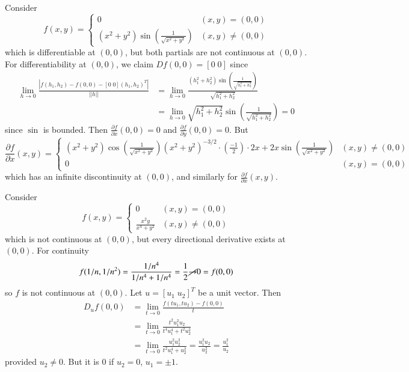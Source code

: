 \begin{eg}
    Consider \begin{equation*}
        f(x,y) = \left\{\begin{array}{lc} 0 & (x,y) = (0,0) \\ (x^2+y^2)\sin\left(\frac{1}{\sqrt{x^2+y^2}}\right) & (x,y) \neq (0,0)\end{array}\right.
    \end{equation*}
    which is differentiable at $(0,0)$, but both partials are not continuous at $(0,0)$. For differentiability at $(0,0)$, we claim $Df(0,0) = [0\;0]$ since \begin{align*}
        \lim\limits_{h\rightarrow 0}\frac{|f(h_1,h_2) - f(0,0) - [0\;0](h_1,h_2)^T|}{||h||} &= \lim\limits_{h\rightarrow 0}\frac{(h_1^2+h_2^2)\sin\left(\frac{1}{\sqrt{h_1^2+h_2^2}}\right)}{\sqrt{h_1^2+h_2^2}} \\
        &= \lim\limits_{h\rightarrow 0}\sqrt{h_1^2+h_2^2}\sin\left(\frac{1}{\sqrt{h_1^2+h_2^2}}\right) = 0
    \end{align*}
    since $\sin$ is bounded. Then $\frac{\partial f}{\partial x}(0,0) = 0$ and $\frac{\partial f}{\partial y}(0,0) = 0$. But \begin{equation*}
        \frac{\partial f}{\partial x}(x,y) = \left\{\begin{array}{cc} (x^2+y^2)\cos\left(\frac{1}{\sqrt{x^2+y^2}}\right)(x^2+y^2)^{-3/2}\cdot\left(\frac{-1}{2}\right)\cdot 2x + 2x\sin\left(\frac{1}{\sqrt{x^2+y^2}}\right) & (x,y)\neq (0,0) \\ 0 & (x,y) = (0,0) \end{array}\right.
    \end{equation*}
    which has an infinite discontinuity at $(0,0)$, and similarly for $\frac{\partial f}{\partial x}(x,y)$.
\end{eg}



\begin{eg}
    Consider \begin{equation*}
        f(x,y) = \left\{\begin{array}{cc} 0 & (x,y) = (0,0) \\ \frac{x^2y}{x^4+y^2} & (x,y) \neq (0,0) \end{array}\right.
    \end{equation*}
    which is not continuous at $(0,0)$, but every directional derivative exists at $(0,0)$. For continuity $$f(1/n,1/n^2) = \frac{1/n^4}{1/n^4+1/n^4} = \frac{1}{2}\cancel{\rightarrow } 0 = f(0,0)$$ so $f$ is not continuous at $(0,0)$. Let $u = [u_1\;u_2]^T$ be a unit vector. Then \begin{align*}
        D_uf(0,0) &= \lim\limits_{t\rightarrow 0}\frac{f(tu_1,tu_2) - f(0,0)}{t} \\
        &= \lim\limits_{t\rightarrow 0}\frac{t^2u_1^2u_2}{t^4u_1^4+t^2u_2^2} \\
        &= \lim\limits_{t\rightarrow 0}\frac{u_1^2u_2^2}{t^2u_1^4+u_2^2} = \frac{u_1^2u_2}{u_2^2} = \frac{u_1^2}{u_2}
    \end{align*}
    provided $u_2 \neq 0$. But it is $0$ if $u_2 = 0$, $u_1 = \pm 1$.
\end{eg}

